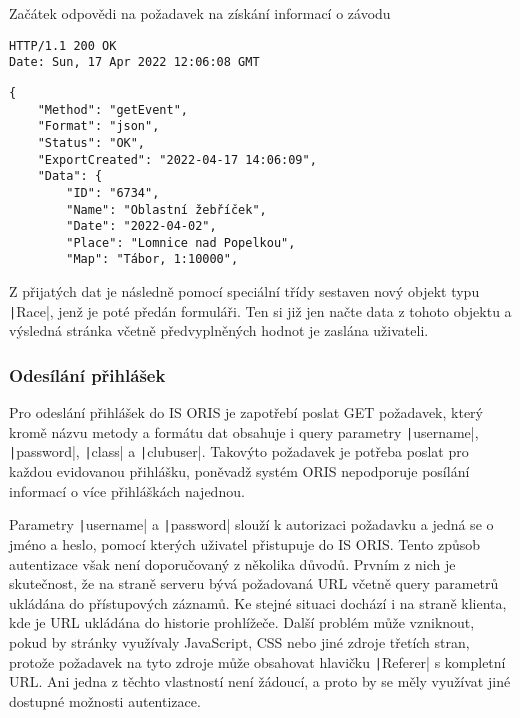 \begin{listing}[h]
    \caption{Začátek odpovědi na požadavek na získání informací o závodu}\label{listing:get-event-response}
    \begin{verbatim}
HTTP/1.1 200 OK
Date: Sun, 17 Apr 2022 12:06:08 GMT

    \end{verbatim}
    \vspace{-11mm}
    \begin{verbatim}
{
    "Method": "getEvent",
    "Format": "json",
    "Status": "OK",
    "ExportCreated": "2022-04-17 14:06:09",
    "Data": {
        "ID": "6734",
        "Name": "Oblastní žebříček",
        "Date": "2022-04-02",
        "Place": "Lomnice nad Popelkou",
        "Map": "Tábor, 1:10000",
    \end{verbatim}
\end{listing}

Z přijatých dat je následně pomocí speciální třídy sestaven nový objekt typu \texttt|Race|, jenž je poté předán formuláři. Ten si již jen načte data z tohoto objektu a výsledná stránka včetně předvyplněných hodnot je zaslána uživateli.

\newpage

\subsubsection{Odesílání přihlášek}
Pro odeslání přihlášek do IS ORIS je zapotřebí poslat GET požadavek, který kromě názvu metody a formátu dat obsahuje i query parametry \texttt|username|, \texttt|password|, \texttt|class| a \texttt|clubuser|. Takovýto požadavek je potřeba poslat pro každou evidovanou přihlášku, poněvadž systém ORIS nepodporuje posílání informací o více přihláškách najednou.

Parametry \texttt|username| a \texttt|password| slouží k autorizaci požadavku a jedná se o jméno a heslo, pomocí kterých uživatel přistupuje do IS ORIS. Tento způsob autentizace však není doporučovaný z několika důvodů. Prvním z nich je skutečnost, že na straně serveru bývá požadovaná URL včetně query parametrů ukládána do přístupových záznamů. Ke stejné situaci dochází i na straně klienta, kde je URL ukládána do historie prohlížeče. Další problém může vzniknout, pokud by stránky využívaly JavaScript, CSS nebo jiné zdroje třetích stran, protože požadavek na tyto zdroje může obsahovat hlavičku \texttt|Referer| s kompletní URL. Ani jedna z těchto vlastností není žádoucí, a proto by se měly využívat jiné dostupné možnosti autentizace. \cite{query-parameters-security}

